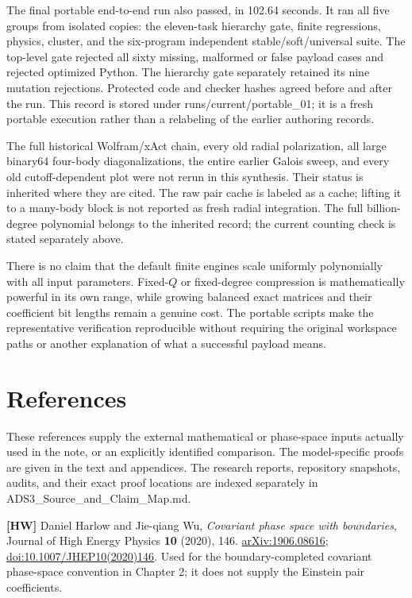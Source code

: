 \documentclass[a4paper,11pt]{article}
\numberwithin{equation}{section}
\begin{document}
The final portable end-to-end run also passed, in 102.64 seconds. It ran all five groups from isolated copies: the eleven-task hierarchy gate, finite regressions, physics, cluster, and the six-program independent stable/soft/universal suite. The top-level gate rejected all sixty missing, malformed or false payload cases and rejected optimized Python. The hierarchy gate separately retained its nine mutation rejections. Protected code and checker hashes agreed before and after the run. This record is stored under runs/current/portable\_01; it is a fresh portable execution rather than a relabeling of the earlier authoring records.

The full historical Wolfram/xAct chain, every old radial polarization, all large binary64 four-body diagonalizations, the entire earlier Galois sweep, and every old cutoff-dependent plot were not rerun in this synthesis. Their status is inherited where they are cited. The raw pair cache is labeled as a cache; lifting it to a many-body block is not reported as fresh radial integration. The full billion-degree polynomial belongs to the inherited record; the current counting check is stated separately above.

There is no claim that the default finite engines scale uniformly polynomially with all input parameters. Fixed-\(Q\) or fixed-degree compression is mathematically powerful in its own range, while growing balanced exact matrices and their coefficient bit lengths remain a genuine cost. The portable scripts make the representative verification reproducible without requiring the original workspace paths or another explanation of what a successful payload means.

\clearpage
\hypertarget{references}{%
\section{References}\label{references}}

These references supply the external mathematical or phase-space inputs actually used in the note, or an explicitly identified comparison. The model-specific proofs are given in the text and appendices. The research reports, repository snapshots, audits, and their exact proof locations are indexed separately in ADS3\_Source\_and\_Claim\_Map.md.

\textbf{{[}HW{]}} Daniel Harlow and Jie-qiang Wu, \emph{Covariant phase space with boundaries}, Journal of High Energy Physics \textbf{10} (2020), 146. \href{https://arxiv.org/abs/1906.08616}{arXiv:1906.08616}; \href{https://doi.org/10.1007/JHEP10(2020)146}{doi:10.1007/JHEP10(2020)146}. Used for the boundary-completed covariant phase-space convention in Chapter 2; it does not supply the Einstein pair coefficients.
\end{document}
